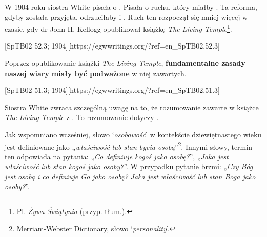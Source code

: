 W 1904 roku siostra White pisała o . Pisała o ruchu, który miałby . Ta reforma, gdyby została przyjęta, odrzuciłaby  i . Ruch ten rozpoczął się mniej więcej w czasie, gdy dr John H. Kellogg opublikował książkę \textit{The Living Temple}\footnote{Pl. \textit{Żywa Świątynia} (przyp. tłum.).}.

[SpTB02 52.3; 1904][https://egwwritings.org/?ref=en\_SpTB02.52.3]

Poprzez opublikowanie książki \textit{The Living Temple}, \textbf{fundamentalne zasady naszej wiary} \textbf{miały być podważone}  w niej zawartych.

[SpTB02 51.3; 1904][https://egwwritings.org/?ref=en\_SpTB02.51.3]

Siostra White zwraca szczególną uwagę na to, że rozumowanie zawarte w książce \textit{The Living Temple}  z . To rozumowanie dotyczy .

Jak wspomniano wcześniej, słowo ‘\textit{osobowość}’ w kontekście dziewiętnastego wieku jest definiowane jako „\textit{właściwość lub stan bycia osobą}”\footnote{\href{https://www.merriam-webster.com/dictionary/personality}{Merriam-Webster Dictionary}, słowo ‘\textit{personality}’.}. Innymi słowy, termin ten odpowiada na pytania: „\textit{Co definiuje kogoś jako osobę?}”, „\textit{Jaka jest właściwość lub stan kogoś jako osoby?}”. W przypadku  pytanie brzmi: „\textit{Czy Bóg jest osobą i co definiuje Go jako osobę? Jaka jest właściwość lub stan Boga jako osoby?}”.


